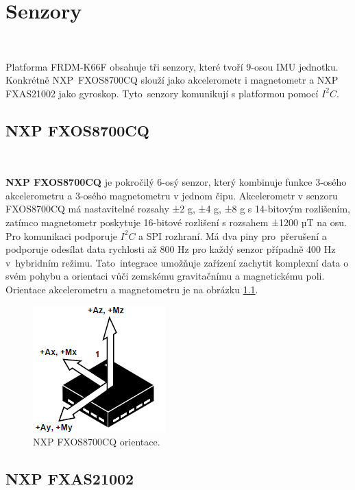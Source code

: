 \chapter{Senzory}
\label{sec:Sensors}
\vspace{-20pt}
\

Platforma FRDM-K66F obsahuje tři senzory, které tvoří 9-osou IMU jednotku. Konkrétně
NXP~FXOS8700CQ slouží jako akcelerometr i magnetometr a NXP FXAS21002 jako gyroskop.
Tyto~senzory komunikují s platformou pomocí $I^2C$\cite{frdmk66UserGuide}.

\section{NXP FXOS8700CQ}\

\textbf{NXP FXOS8700CQ} je pokročilý 6-osý senzor, který kombinuje funkce 3-osého
akcelerometru a 3-osého magnetometru v jednom čipu. Akcelerometr v senzoru
FXOS8700CQ má nastavitelné rozsahy ±2 g, ±4 g, ±8 g s 14-bitovým rozlišením, zatímco
magnetometr poskytuje 16-bitové rozlišení s rozsahem ±1200 µT na osu. Pro komunikaci
podporuje $I^2C$ a SPI rozhraní. Má dva piny pro~přerušení a podporuje odesílat data
rychlosti až 800 Hz pro každý senzor případně 400 Hz v~hybridním režimu.
Tato~integrace umožňuje zařízení zachytit komplexní data o svém pohybu a orientaci
vůči zemskému gravitačnímu a magnetickému poli. Orientace akcelerometru a
magnetometru je na obrázku \ref{fig:FXOS_Orientation}\cite{FXOS8700CQ}.

\begin{figure}[!h]
	\vspace{-10pt}
    \centering
    \includegraphics[width = .45\linewidth]{Figures/FXOS_Orientation.png}
    \caption{NXP FXOS8700CQ orientace\cite{FXOS8700CQ}.}
    \label{fig:FXOS_Orientation}
    \vspace{-10pt}
\end{figure}

\section{NXP FXAS21002}\

